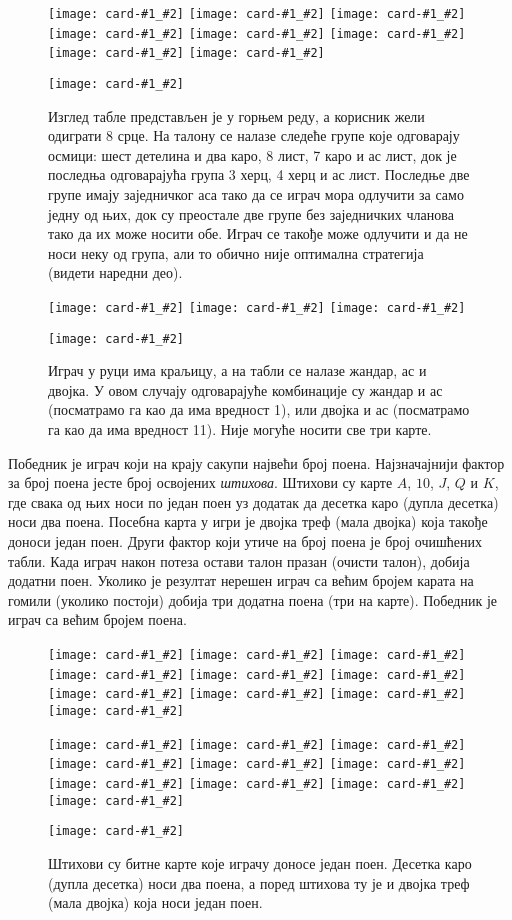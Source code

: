 \documentclass[a4paper, 12pt, ngerman]{article}
\newcommand{\quotesrb}[1]{\glqq#1\grqq}
\newcommand{\card}[2]{\texttt{[image: card-\#1\_\#2]}}
\newcommand{\cardmed}[2]{\texttt{[image: card-\#1\_\#2]}}
\begin{document}
\begin{figure}[htbp]
	\centering
	\card{6}{club}
	\card{2}{diamond}
	\card{jack}{club}
	\card{8}{spade}
	\card{3}{heart}
	\card{7}{diamond}
	\card{4}{heart}
	\card{1}{spade}
	
	\card{8}{heart}
	\caption{Изглед табле представљен је у горњем реду, а корисник жели одиграти 8 срце. На талону се налазе следеће групе које одговарају осмици: шест детелина и два каро, 8 лист, 7 каро и ас лист, док је последња одговарајућа група 3 херц, 4 херц и ас лист. Последње две групе имају заједничког аса тако да се играч мора одлучити за само једну од њих, док су преостале две групе без заједничких чланова тако да их може носити обе. Играч се такође може одлучити и да не носи неку од група, али то обично није оптимална стратегија (видети наредни део).}
\end{figure}


\begin{figure}[htbp]
	\centering
	\card{jack}{heart}
	\card{1}{spade}
	\card{2}{diamond}
		
	\card{queen}{heart}
	\caption{Играч у руци има краљицу, а на табли се налазе жандар, ас и двојка. У овом случају одговарајуће комбинације су жандар и ас (посматрамо га као да има вредност 1), или двојка и ас (посматрамо га као да има вредност 11). Није могуће носити све три карте.}
\end{figure}


Победник је играч који на крају сакупи највећи број поена. Најзначајнији фактор за број поена јесте број освојених \textit{штихова}. Штихови су карте $A$, $10$, $J$, $Q$ и $K$, где свака од њих носи по један поен уз додатак да десетка каро (дупла десетка) носи два поена. Посебна карта у игри је двојка треф (мала двојка) која такође доноси један поен. Други фактор који утиче на број поена је број \quotesrb{очишћених} табли. Када играч након потеза остави талон празан (очисти талон), добија додатни поен. Уколико је резултат нерешен играч са већим бројем карата на гомили (уколико постоји) добија три додатна поена (три на карте). Победник је играч са већим бројем поена.

\begin{figure}[htbp]
	\centering
	\cardmed{1}{spade}
	\cardmed{10}{spade}
	\cardmed{jack}{spade}
	\cardmed{queen}{spade}
	\cardmed{king}{spade}
	\cardmed{1}{heart}
	\cardmed{10}{heart}
	\cardmed{jack}{heart}
	\cardmed{queen}{heart}
	\cardmed{king}{heart}
	
	\cardmed{1}{club}
	\cardmed{10}{club}
	\cardmed{jack}{club}
	\cardmed{queen}{club}
	\cardmed{king}{club}
	\cardmed{1}{diamond}
	\cardmed{10}{diamond}
	\cardmed{jack}{diamond}
	\cardmed{queen}{diamond}
	\cardmed{king}{diamond}
	
	\cardmed{2}{club}
	\caption{Штихови су битне карте које играчу доносе један поен. Десетка каро (дупла десетка) носи два поена, а поред штихова ту је и двојка треф (мала двојка) која носи један поен.}
\end{figure}
\end{document}
